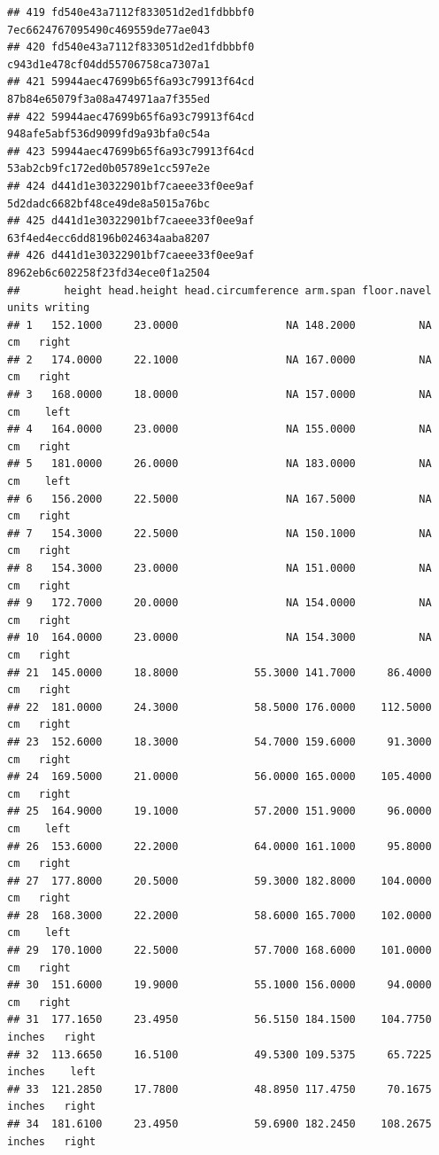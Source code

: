 \documentclass[]{article}
\begin{document}
\begin{verbatim}
## 419 fd540e43a7112f833051d2ed1fdbbbf0   7ec6624767095490c469559de77ae043
## 420 fd540e43a7112f833051d2ed1fdbbbf0   c943d1e478cf04dd55706758ca7307a1
## 421 59944aec47699b65f6a93c79913f64cd   87b84e65079f3a08a474971aa7f355ed
## 422 59944aec47699b65f6a93c79913f64cd   948afe5abf536d9099fd9a93bfa0c54a
## 423 59944aec47699b65f6a93c79913f64cd   53ab2cb9fc172ed0b05789e1cc597e2e
## 424 d441d1e30322901bf7caeee33f0ee9af   5d2dadc6682bf48ce49de8a5015a76bc
## 425 d441d1e30322901bf7caeee33f0ee9af   63f4ed4ecc6dd8196b024634aaba8207
## 426 d441d1e30322901bf7caeee33f0ee9af   8962eb6c602258f23fd34ece0f1a2504
##       height head.height head.circumference arm.span floor.navel  units writing
## 1   152.1000     23.0000                 NA 148.2000          NA     cm   right
## 2   174.0000     22.1000                 NA 167.0000          NA     cm   right
## 3   168.0000     18.0000                 NA 157.0000          NA     cm    left
## 4   164.0000     23.0000                 NA 155.0000          NA     cm   right
## 5   181.0000     26.0000                 NA 183.0000          NA     cm    left
## 6   156.2000     22.5000                 NA 167.5000          NA     cm   right
## 7   154.3000     22.5000                 NA 150.1000          NA     cm   right
## 8   154.3000     23.0000                 NA 151.0000          NA     cm   right
## 9   172.7000     20.0000                 NA 154.0000          NA     cm   right
## 10  164.0000     23.0000                 NA 154.3000          NA     cm   right
## 21  145.0000     18.8000            55.3000 141.7000     86.4000     cm   right
## 22  181.0000     24.3000            58.5000 176.0000    112.5000     cm   right
## 23  152.6000     18.3000            54.7000 159.6000     91.3000     cm   right
## 24  169.5000     21.0000            56.0000 165.0000    105.4000     cm   right
## 25  164.9000     19.1000            57.2000 151.9000     96.0000     cm    left
## 26  153.6000     22.2000            64.0000 161.1000     95.8000     cm   right
## 27  177.8000     20.5000            59.3000 182.8000    104.0000     cm   right
## 28  168.3000     22.2000            58.6000 165.7000    102.0000     cm    left
## 29  170.1000     22.5000            57.7000 168.6000    101.0000     cm   right
## 30  151.6000     19.9000            55.1000 156.0000     94.0000     cm   right
## 31  177.1650     23.4950            56.5150 184.1500    104.7750 inches   right
## 32  113.6650     16.5100            49.5300 109.5375     65.7225 inches    left
## 33  121.2850     17.7800            48.8950 117.4750     70.1675 inches   right
## 34  181.6100     23.4950            59.6900 182.2450    108.2675 inches   right

\end{verbatim}
\end{document}
